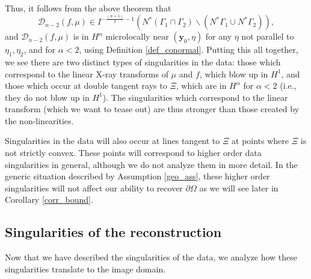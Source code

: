 \documentclass[a4paper,12pt]{amsart}
\numberwithin{equation}{section}
\theoremstyle{plain}
\numberwithin{theorem}{section}
\theoremstyle{definition}
\theoremstyle{remark}
\theoremstyle{remark}
\theoremstyle{remark}
\newcommand{\vy}{{\mathbf{y}}}
\begin{document}
{Thus, it follows from the above theorem that 
\begin{equation}
\mathcal{D}_{n-2}(f,\mu) \in I^{- \frac{(n+1)}{2}-1}(N^*(\Gamma_1 \cap \Gamma_2)\backslash (N^*\Gamma_1 \cup N^* \Gamma_2) ),
\end{equation}
and $\mathcal{D}_{n-2}(f,\mu)$ is in $H^{\alpha}$ microlocally near $(\vy_0,\eta)$ for any $\eta$ not parallel to $\eta_1, \eta_2$, and for $\alpha < 2$, using Definition \ref{def_conormal}. Putting this all together, we see there are two distinct types of singularities in the data: those which correspond to the linear X-ray transforms of $\mu$ and $f$, which blow up in $H^1$, and those which occur at double tangent rays to $\Xi$, which are in $H^{\alpha}$ for $\alpha < 2$ (i.e., they do not blow up in $H^1$). The singularities which correspond to the linear transform (which we want to tease out) are thus stronger than those created by the non-linearities.

Singularities in the data will also occur at lines tangent to $\Xi$ at points where $\Xi$ is not strictly convex. These points will correspond to higher order data singularities in general, although we do not analyze them in more detail. In the generic situation described by Assumption \ref{geo_ass}, these higher order singularities will not affect our ability to recover $\partial \Omega$ as we will see later in Corollary \ref{corr_bound}.

\subsection{Singularities of the reconstruction}\label{sing_recon} Now that we have described the singularities of the data, we analyze how these singularities translate to the image domain.

}
\end{document}
